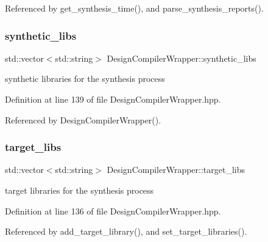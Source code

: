 Referenced by get\+\_\+synthesis\+\_\+time(), and parse\+\_\+synthesis\+\_\+reports().

\mbox{\label{classDesignCompilerWrapper_ab431580cc57f7b57555dd9b54ee08f11}} 
\subsubsection{\texorpdfstring{synthetic\+\_\+libs}{synthetic\_libs}}
{\footnotesize\ttfamily std\+::vector$<$std\+::string$>$ Design\+Compiler\+Wrapper\+::synthetic\+\_\+libs\hspace{0.3cm}{\ttfamily [protected]}}



synthetic libraries for the synthesis process 



Definition at line 139 of file Design\+Compiler\+Wrapper.\+hpp.



Referenced by Design\+Compiler\+Wrapper().

\mbox{\label{classDesignCompilerWrapper_a608e6f7bd836a32275d1cef0edc23d8b}} 
\subsubsection{\texorpdfstring{target\+\_\+libs}{target\_libs}}
{\footnotesize\ttfamily std\+::vector$<$std\+::string$>$ Design\+Compiler\+Wrapper\+::target\+\_\+libs\hspace{0.3cm}{\ttfamily [protected]}}



target libraries for the synthesis process 



Definition at line 136 of file Design\+Compiler\+Wrapper.\+hpp.



Referenced by add\+\_\+target\+\_\+library(), and set\+\_\+target\+\_\+libraries().

\mbox{\label{classDesignCompilerWrapper_a6e95ae9b696ba0d23c09d07c8648da7d}} 
